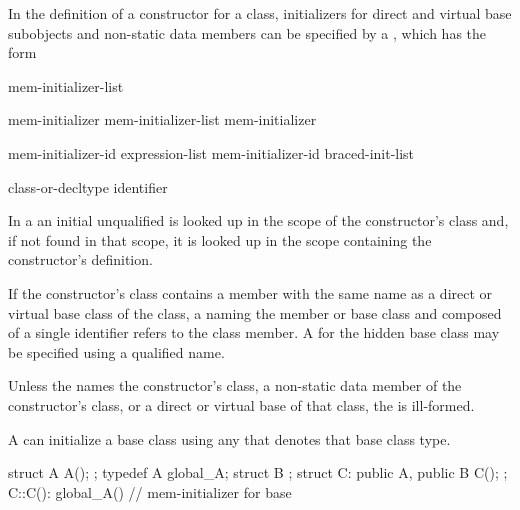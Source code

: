 \pnum
In the definition of a constructor for a class,
initializers for direct and virtual base subobjects and
non-static data members can be specified by a
,
which has the form

\begin{bnf}
\br
    \terminal{:} mem-initializer-list
\end{bnf}

\begin{bnf}
\br
    mem-initializer \opt\br
    mem-initializer-list \terminal{,} mem-initializer \opt
\end{bnf}

\begin{bnf}
\br
    mem-initializer-id \terminal{(} expression-list\opt{} \terminal{)}\br
    mem-initializer-id braced-init-list
\end{bnf}

\begin{bnf}
\br
    class-or-decltype\br
    identifier
\end{bnf}

\pnum
In a  an initial unqualified
 is looked up in the scope of the constructor's class
and, if not found in that scope, it is looked up in the scope containing the
constructor's definition.
\begin{note}
If the constructor's class contains a member with the same name as a direct
or virtual base class of the class, a
naming the member or base class and composed of a single identifier
refers to the class member.
A
for the hidden base class may be specified using a qualified name.
\end{note}
Unless the
names the constructor's class,
a non-static data member of the constructor's class, or
a direct or virtual base of that class,
the
is ill-formed.

\pnum
A
can initialize a base class using any  that denotes that base class type.
\begin{example}

\begin{codeblock}
struct A { A(); };
typedef A global_A;
struct B { };
struct C: public A, public B { C(); };
C::C(): global_A() { }        // mem-initializer for base 
\end{codeblock}
\end{example}

